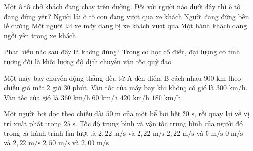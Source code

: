 \begin{ex}
Một ô tô chở khách đang chạy trên đường. Đối với người nào dưới đây thì ô tô đang đứng yên?
\choice
{Người lái ô tô con đang vượt qua xe khách}
{Người đang đứng bên lề đường}
{Một người lái xe máy đang bị xe khách vượt qua}
{\True Một hành khách đang ngồi yên trong xe khách}
\end{ex}

\begin{ex}
Phát biểu nào sau đây là không đúng? Trong cơ học cổ điển, đại lượng có tính tương đối là
\choice
{\True khối lượng}
{độ dịch chuyển}
{vận tốc}
{quỹ đạo}
\end{ex}

\begin{ex}
Một máy bay chuyển động thẳng đều từ A đến điểm B cách nhau $900\text{ km}$ theo chiều gió mất $2\text{ giờ } 30\text{ phút}$. Vận tốc của máy bay khi không có gió là $300\text{ km/h}$. Vận tốc của gió là
\choice
{$360\text{ km/h}$}
{\True $60\text{ km/h}$}
{$420\text{ km/h}$}
{$180\text{ km/h}$}
\end{ex}

\begin{ex}
Một người bơi dọc theo chiều dài $50\text{ m}$ của một bể bơi hết $20\text{ s}$, rồi quay lại về vị trí xuất phát trong $25\text{ s}$. Tốc độ trung bình và vận tốc trung bình của người đó trong cả hành trình lần lượt là
\choice
{$2{,}22\text{ m/s}$ và $2{,}22\text{ m/s}$}
{\True $2{,}22\text{ m/s}$ và $0\text{ m/s}$}
{$0\text{ m/s}$ và $2{,}22\text{ m/s}$}
{$2{,}50\text{ m/s}$ và $2{,}00\text{ m/s}$}
\end{ex}


